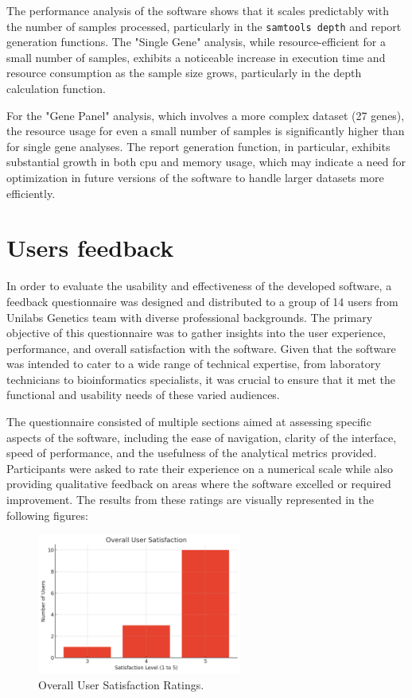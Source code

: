 The performance analysis of the software shows that it scales predictably with the number of samples processed, particularly in the \texttt{samtools depth} and report generation functions. The "Single Gene" analysis, while resource-efficient for a small number of samples, exhibits a noticeable increase in execution time and resource consumption as the sample size grows, particularly in the depth calculation function. 

For the "Gene Panel" analysis, which involves a more complex dataset (27 genes), the resource usage for even a small number of samples is significantly higher than for single gene analyses. The report generation function, in particular, exhibits substantial growth in both \ac{cpu} and memory usage, which may indicate a need for optimization in future versions of the software to handle larger datasets more efficiently.


\section{Users feedback}

In order to evaluate the usability and effectiveness of the developed software, a feedback questionnaire was designed and distributed to a group of 14 users from Unilabs Genetics team with diverse professional backgrounds. The primary objective of this questionnaire was to gather insights into the user experience, performance, and overall satisfaction with the software. Given that the software was intended to cater to a wide range of technical expertise, from laboratory technicians to bioinformatics specialists, it was crucial to ensure that it met the functional and usability needs of these varied audiences.

The questionnaire consisted of multiple sections aimed at assessing specific aspects of the software, including the ease of navigation, clarity of the interface, speed of performance, and the usefulness of the analytical metrics provided. Participants were asked to rate their experience on a numerical scale while also providing qualitative feedback on areas where the software excelled or required improvement. The results from these ratings are visually represented in the following figures:

\begin{figure}[H] 
    \centering 
    \includegraphics[width=0.6\textwidth]{figs/overall_satisfaction_graph.png} 
    \caption{Overall User Satisfaction Ratings.} 
    \label{fig:overall_satisfaction}
\end{figure}

